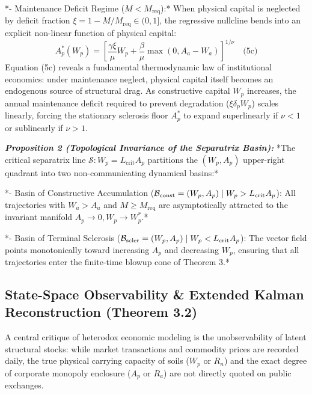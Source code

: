 \documentclass[preprint,12pt,authoryear]{elsarticle}
\theoremstyle{definition}
\begin{document}
*- Maintenance Deficit Regime ($M < M_{\text{req}}$):* When physical capital is neglected by deficit fraction $\xi = 1 - M/M_{\text{req}} \in (0, 1]$, the regressive nullcline bends into an explicit non-linear function of physical capital: $$A_p^*(W_p) = \left[ \frac{\gamma \xi}{\mu} W_p + \frac{\beta}{\mu} \max(0, A_a - W_a) \right]^{1/\nu} \quad \text{(5c)}$$ Equation (5c) reveals a fundamental thermodynamic law of institutional economics: under maintenance neglect, physical capital itself becomes an endogenous source of structural drag. As constructive capital $W_p$ increases, the annual maintenance deficit required to prevent degradation ($\xi \delta_p W_p$) scales linearly, forcing the stationary sclerosis floor $A_p^*$ to expand superlinearly if $\nu < 1$ or sublinearly if $\nu > 1$.

\textbf{\textit{Proposition 2 (Topological Invariance of the Separatrix Basin):}} *The critical separatrix line $\mathcal{S}: W_p = L_{\text{crit}} A_p$ partitions the $(W_p, A_p)$ upper-right quadrant into two non-communicating dynamical basins:* 

*- Basin of Constructive Accumulation ($\mathcal{B}_{\text{const}} = \\{(W_p, A_p) \mid W_p > L_{\text{crit}} A_p\\}$): All trajectories with $W_a > A_a$ and $M \ge M_{\text{req}}$ are asymptotically attracted to the invariant manifold $A_p \to 0, W_p \to W_p^*$.* 

*- Basin of Terminal Sclerosis ($\mathcal{B}_{\text{scler}} = \\{(W_p, A_p) \mid W_p < L_{\text{crit}} A_p\\}$): The vector field points monotonically toward increasing $A_p$ and decreasing $W_p$, ensuring that all trajectories enter the finite-time blowup cone of Theorem 3.*

\subsection{State-Space Observability \& Extended Kalman Reconstruction (Theorem 3.2)}

A central critique of heterodox economic modeling is the unobservability of latent structural stocks: while market transactions and commodity prices are recorded daily, the true physical carrying capacity of soils ($W_p$ or $R_n$) and the exact degree of corporate monopoly enclosure ($A_p$ or $R_a$) are not directly quoted on public exchanges.
\end{document}
